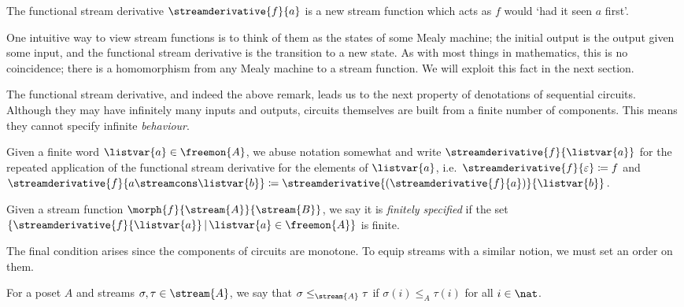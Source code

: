 The functional stream derivative \(\streamderivative{f}{a}\) is a new stream
function which acts as \(f\) would `had it seen \(a\) first'.

\begin{remark}
    One intuitive way to view stream functions is to think of them as the states
    of some Mealy machine; the initial output is the output given some input,
    and the functional stream derivative is the transition to a new state.
    As with most things in mathematics, this is no coincidence; there is a
    homomorphism from any Mealy machine to a stream function.
    We will exploit this fact in the next section.
\end{remark}

The functional stream derivative, and indeed the above remark, leads us to the
next property of denotations of sequential circuits.
Although they may have infinitely many inputs and outputs, circuits themselves
are built from a finite number of components.
This means they cannot specify infinite \emph{behaviour}.

\begin{notation}
    Given a finite word \(\listvar{a} \in \freemon{A}\), we abuse notation
    somewhat and write \(\streamderivative{f}{\listvar{a}}\) for the repeated
    application of the functional stream derivative for the elements of
    \(\listvar{a}\), i.e.\ \(
    \streamderivative{f}{\varepsilon} \coloneqq f
    \) and \(
    \streamderivative{f}{a \streamcons \listvar{b}} \coloneqq
    \streamderivative{(\streamderivative{f}{a})}{\listvar{b}}
    \).
\end{notation}

\begin{definition}
    Given a stream function \(\morph{f}{\stream{A}}{\stream{B}}\), we say it is
    \emph{finitely specified} if the set \(\{
    \streamderivative{f}{\listvar{a}} \,|\, \listvar{a} \in \freemon{A}
    \}\) is finite.
\end{definition}

The final condition arises since the components of circuits are monotone.
To equip streams with a similar notion, we must set an order on them.

\begin{notation}
    For a poset \(A\) and streams \(\sigma,\tau \in \stream{A}\), we say that
    \(\sigma \leq_{\stream{A}} \tau\) if \(\sigma(i) \leq_A \tau(i)\) for all
    \(i \in \nat\).
\end{notation}

